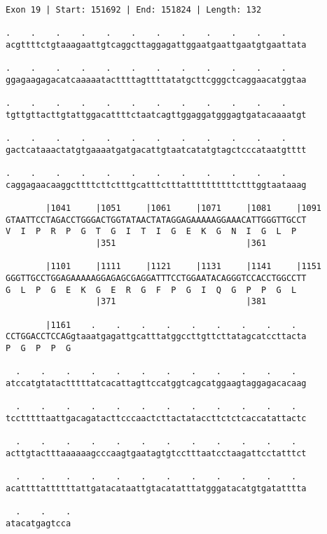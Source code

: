 \documentclass{article}
\begin{document}
\begin{Verbatim}
Exon 19 | Start: 151692 | End: 151824 | Length: 132
 
.    .    .    .    .    .    .    .    .    .    .    .    
acgttttctgtaaagaattgtcaggcttaggagattggaatgaattgaatgtgaattata
  
.    .    .    .    .    .    .    .    .    .    .    .    
ggagaagagacatcaaaaatacttttagttttatatgcttcgggctcaggaacatggtaa
  
.    .    .    .    .    .    .    .    .    .    .    .    
tgttgttacttgtattggacattttctaatcagttggaggatgggagtgatacaaaatgt
  
.    .    .    .    .    .    .    .    .    .    .    .    
gactcataaactatgtgaaaatgatgacattgtaatcatatgtagctcccataatgtttt
  
.    .    .    .    .    .    .    .    .    .    .    .    
caggagaacaaggcttttcttctttgcatttctttattttttttttctttggtaataaag
  
        |1041     |1051     |1061     |1071     |1081     |1091
GTAATTCCTAGACCTGGGACTGGTATAACTATAGGAGAAAAAGGAAACATTGGGTTGCCT
V  I  P  R  P  G  T  G  I  T  I  G  E  K  G  N  I  G  L  P  
                  |351                          |361        
  
        |1101     |1111     |1121     |1131     |1141     |1151
GGGTTGCCTGGAGAAAAAGGAGAGCGAGGATTTCCTGGAATACAGGGTCCACCTGGCCTT
G  L  P  G  E  K  G  E  R  G  F  P  G  I  Q  G  P  P  G  L  
                  |371                          |381        
  
        |1161    .    .    .    .    .    .    .    .    .  
CCTGGACCTCCAGgtaaatgagattgcatttatggccttgttcttatagcatccttacta
P  G  P  P  G                                               
  
  .    .    .    .    .    .    .    .    .    .    .    .  
atccatgtatactttttatcacattagttccatggtcagcatggaagtaggagacacaag
  
  .    .    .    .    .    .    .    .    .    .    .    .  
tcctttttaattgacagatacttcccaactcttactataccttctctcaccatattactc
  
  .    .    .    .    .    .    .    .    .    .    .    .  
acttgtactttaaaaaagcccaagtgaatagtgtcctttaatcctaagattcctatttct
  
  .    .    .    .    .    .    .    .    .    .    .    .  
acattttattttttattgatacataattgtacatatttatgggatacatgtgatatttta
  
  .    .    .
atacatgagtcca
\end{Verbatim}
\newpage
\end{document}
